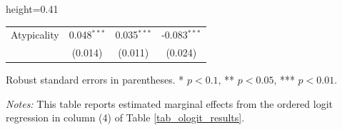 \begin{table}[H]
\begin{adjustbox}{height=0.41\textheight}
\begin{threeparttable}
\begin{tabular}{lccc}
Atypicality  & 0.048$^{***}$ & 0.035$^{***}$ & -0.083$^{***}$ \\
 & (0.014) & (0.011) & (0.024) \\ [1.8ex]
\bottomrule
\end{tabular}
\begin{tablenotes}[flushleft]
\footnotesize
\item Robust standard errors in parentheses. * $p<0.1$, ** $p<0.05$, *** $p<0.01$.
\item \textit{Notes:} This table reports estimated marginal effects from the ordered logit regression in column (4) of Table \ref{tab_ologit_results}.
\end{tablenotes}
\end{threeparttable}
\end{adjustbox}
\end{table}
